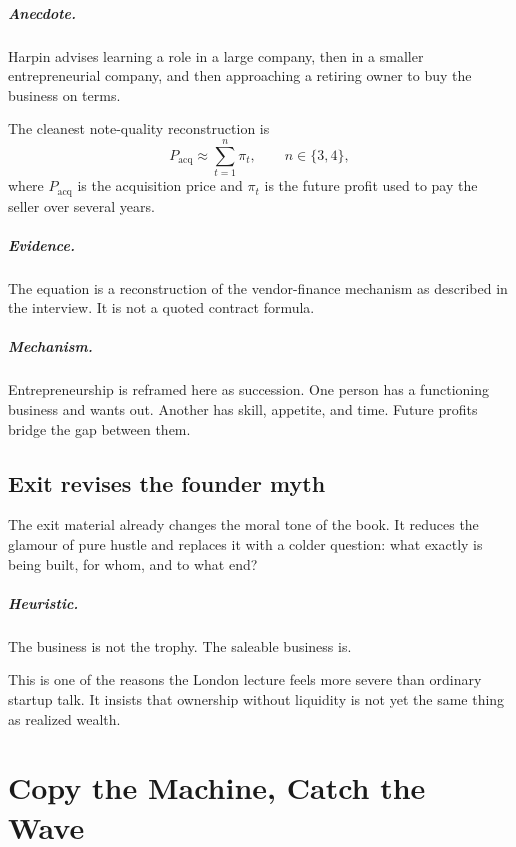 \documentclass[11pt,oneside]{book}
\begin{document}
\paragraph{Anecdote.} Harpin advises learning a role in a large company, then in a smaller entrepreneurial company, and then approaching a retiring owner to buy the business on terms.

The cleanest note-quality reconstruction is
\begin{equation}
P_{\mathrm{acq}} \approx \sum_{t=1}^{n}\pi_t,
\qquad n\in\{3,4\},
\end{equation}
where \(P_{\mathrm{acq}}\) is the acquisition price and \(\pi_t\) is the future profit used to pay the seller over several years.

\paragraph{Evidence.} The equation is a reconstruction of the vendor-finance mechanism as described in the interview. It is not a quoted contract formula.

\paragraph{Mechanism.} Entrepreneurship is reframed here as succession. One person has a functioning business and wants out. Another has skill, appetite, and time. Future profits bridge the gap between them.

\section{Exit revises the founder myth}

The exit material already changes the moral tone of the book. It reduces the glamour of pure hustle and replaces it with a colder question: what exactly is being built, for whom, and to what end?

\paragraph{Heuristic.} The business is not the trophy. The saleable business is.

This is one of the reasons the London lecture feels more severe than ordinary startup talk. It insists that ownership without liquidity is not yet the same thing as realized wealth.

\chapter{Copy the Machine, Catch the Wave}
\end{document}
